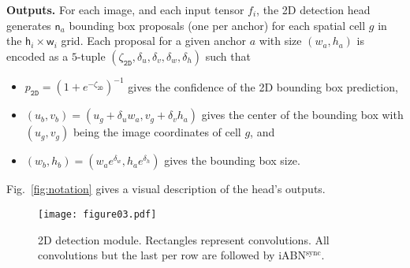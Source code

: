 \documentclass[10pt,twocolumn,letterpaper]{article}
\newcommand{\mat}[1]{\mathtt{#1}}
\newcommand{\con}[1]{\ensuremath{\mathsf{#1}}}
\newcommand{\iABNsync}{iABN$^\text{sync}$\xspace}
\renewcommand{\paragraph}[1]{

        \vspace{3pt}
	\noindent\textbf{#1}}
\begin{document}
\paragraph{Outputs.}
For each image, and each input tensor $f_i$, the 2D detection head generates $\con n_a$ bounding box proposals (one per anchor) for each spatial cell $g$ in the $\con h_i\times \con w_i$ grid. Each proposal for a given anchor $a$ with size $(w_a, h_a)$ is encoded as a $5$-tuple $(\zeta_{\mat {2D}}, \delta_u, \delta_v, \delta_w, \delta_h)$ such that 
\begin{itemize}
\item $p_{\mat{2D}}=(1+e^{-\zeta_\mat{2D}})^{-1}$ gives the confidence of the 2D bounding box prediction,
\item $(u_b,v_b)=(u_g+\delta_u w_a,v_g+\delta_v h_a)$ gives the center of the bounding box with $(u_g,v_g)$ being the image coordinates of cell $g$, and
\item $(w_b,h_b)=(w_a e^{\delta_w}, h_a e^{\delta_h})$ gives the bounding box size.
\end{itemize}
Fig.~\ref{fig:notation} gives a visual description of the head's outputs.

\begin{figure}
    \centering
    \texttt{[image: figure03.pdf]}
    \caption{2D detection module. Rectangles represent convolutions. All convolutions but the last per row are followed by \iABNsync.}
    \label{fig:head2d}
    \vspace{-12pt}
\end{figure}
\end{document}
